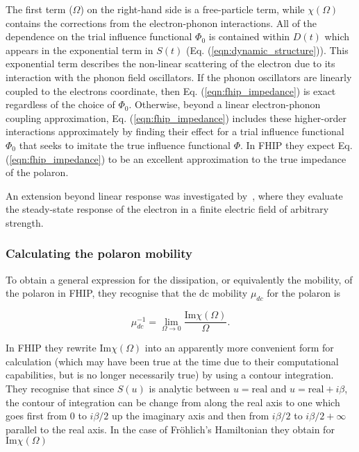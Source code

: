 The first term ($\Omega$) on the right-hand side is a free-particle term, while $\chi(\Omega)$ contains the corrections from the electron-phonon interactions. All of the dependence on the trial influence functional $\Phi_0$ is contained within $D(t)$ which appears in the exponential term in $S(t)$ (Eq. (\ref{eqn:dynamic_structure})). This exponential term describes the non-linear scattering of the electron due to its interaction with the phonon field oscillators. If the phonon oscillators are linearly coupled to the electrons coordinate, then Eq. (\ref{eqn:fhip_impedance}) is exact regardless of the choice of $\Phi_0$. Otherwise, beyond a linear electron-phonon coupling approximation, Eq. (\ref{eqn:fhip_impedance}) includes these higher-order interactions approximately by finding their effect for a trial influence functional $\Phi_0$ that seeks to imitate the true influence functional $\Phi$. In FHIP they expect Eq. (\ref{eqn:fhip_impedance}) to be an excellent approximation to the true impedance of the polaron. 

An extension beyond linear response was investigated by~\cite{thornber_velocity_1970}, where they evaluate the steady-state response of the electron in a finite electric field of arbitrary strength.

\subsubsection{Calculating the polaron mobility}

To obtain a general expression for the dissipation, or equivalently the mobility, of the polaron in FHIP, they recognise that the dc mobility $\mu_{dc}$ for the polaron is

\begin{equation}\label{eqn:FHIP_mobility}
    \mu^{-1}_{dc} = \lim_{\Omega \rightarrow 0} \frac{\textrm{Im}\chi(\Omega)}{\Omega}.
\end{equation}

In FHIP they rewrite $\text{Im} \chi(\Omega)$ into an apparently more convenient form for calculation (which may have been true at the time due to their computational capabilities, but is no longer necessarily true) by using a contour integration. They recognise that since $S(u)$ is analytic between $u = \text{real}$ and $u = \text{real} + i\beta$, the contour of integration can be change from along the real axis to one which goes first from $0$ to $i\beta/2$ up the imaginary axis and then from $i\beta/2$ to $i\beta/2 + \infty$ parallel to the real axis. In the case of Fr\"ohlich's Hamiltonian they obtain for $\textrm{Im}\chi(\Omega)$

